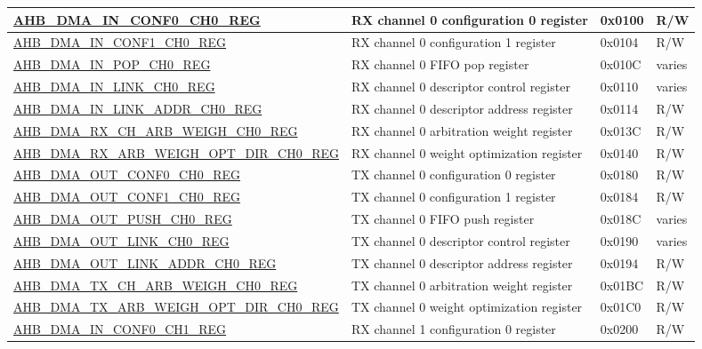 \begin{longtable}{ | l | p{10cm} | p{1.3cm} | l | }
\hyperref[regdesc:AHBDMAINCONF0CHNREG]{AHB\_DMA\_IN\_CONF0\_CH0\_REG} & RX channel 0 configuration 0 register & 0x0100 & R/W \\ \hline
\hyperref[regdesc:AHBDMAINCONF1CHNREG]{AHB\_DMA\_IN\_CONF1\_CH0\_REG} & RX channel 0 configuration 1 register & 0x0104 & R/W \\ \hline
\hyperref[regdesc:AHBDMAINPOPCHNREG]{AHB\_DMA\_IN\_POP\_CH0\_REG} & RX channel 0 FIFO pop register & 0x010C & varies \\ \hline
\hyperref[regdesc:AHBDMAINLINKCHNREG]{AHB\_DMA\_IN\_LINK\_CH0\_REG} & RX channel 0 descriptor control register & 0x0110 & varies \\ \hline
\hyperref[regdesc:AHBDMAINLINKADDRCHNREG]{AHB\_DMA\_IN\_LINK\_ADDR\_CH0\_REG} & RX channel 0 descriptor address register & 0x0114 & R/W \\ \hline
\hyperref[regdesc:AHBDMARXCHARBWEIGHCHNREG]{AHB\_DMA\_RX\_CH\_ARB\_WEIGH\_CH0\_REG} & RX channel 0 arbitration weight register & 0x013C & R/W \\ \hline
\hyperref[regdesc:AHBDMARXARBWEIGHOPTDIRCHNREG]{AHB\_DMA\_RX\_ARB\_WEIGH\_OPT\_DIR\_CH0\_REG} & RX channel 0 weight optimization register & 0x0140 & R/W \\ \hline
\hyperref[regdesc:AHBDMAOUTCONF0CHNREG]{AHB\_DMA\_OUT\_CONF0\_CH0\_REG} & TX channel 0 configuration 0 register & 0x0180 & R/W \\ \hline
\hyperref[regdesc:AHBDMAOUTCONF1CHNREG]{AHB\_DMA\_OUT\_CONF1\_CH0\_REG} & TX channel 0 configuration 1 register & 0x0184 & R/W \\ \hline
\hyperref[regdesc:AHBDMAOUTPUSHCHNREG]{AHB\_DMA\_OUT\_PUSH\_CH0\_REG} & TX channel 0 FIFO push register & 0x018C & varies \\ \hline
\hyperref[regdesc:AHBDMAOUTLINKCHNREG]{AHB\_DMA\_OUT\_LINK\_CH0\_REG} & TX channel 0 descriptor control register & 0x0190 & varies \\ \hline
\hyperref[regdesc:AHBDMAOUTLINKADDRCHNREG]{AHB\_DMA\_OUT\_LINK\_ADDR\_CH0\_REG} & TX channel 0 descriptor address register & 0x0194 & R/W \\ \hline
\hyperref[regdesc:AHBDMATXCHARBWEIGHCHNREG]{AHB\_DMA\_TX\_CH\_ARB\_WEIGH\_CH0\_REG} & TX channel 0 arbitration weight register & 0x01BC & R/W \\ \hline
\hyperref[regdesc:AHBDMATXARBWEIGHOPTDIRCHNREG]{AHB\_DMA\_TX\_ARB\_WEIGH\_OPT\_DIR\_CH0\_REG} & TX channel 0 weight optimization register & 0x01C0 & R/W \\ \hline
\hyperref[regdesc:AHBDMAINCONF0CHNREG]{AHB\_DMA\_IN\_CONF0\_CH1\_REG} & RX channel 1 configuration 0 register & 0x0200 & R/W \\ \hline

\end{longtable}

